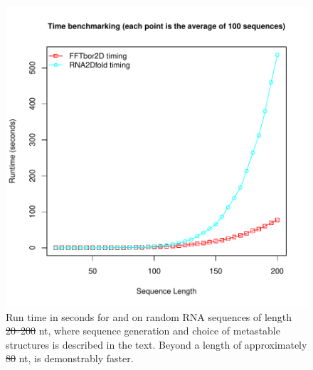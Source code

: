 \documentclass[11pt, oneside]{Thesis} %
\providecommand{\DIFadd}[1]{{\protect\color{blue}\uwave{#1}}} %
\providecommand{\DIFdel}[1]{{\protect\color{red}\sout{#1}}}                      %
\providecommand{\DIFaddFL}[1]{\DIFadd{#1}} %
\providecommand{\DIFdelFL}[1]{\DIFdel{#1}} %
\providecommand{\DIFaddbeginFL}{} %
\providecommand{\DIFaddendFL}{} %
\providecommand{\DIFdelbeginFL}{} %
\providecommand{\DIFdelendFL}{} %
\begin{document}
\begin{figure}[!ht]
\centering
\includegraphics[width=.9\textwidth]{Figures/FFTbor2D/ffttwoRtwofoldTiming.pdf}
\DIFdelbeginFL %
\DIFdelendFL \DIFaddbeginFL \caption[Run time in seconds for \rnatwofold and \ffttwo on random
RNA sequences of length $20$--$200$ nt]{\DIFaddendFL 
Run time in seconds for \rnatwofold and \ffttwo on random
RNA sequences of length \DIFdelbeginFL \DIFdelFL{20--200 }\DIFdelendFL \DIFaddbeginFL \DIFaddFL{$20$--$200$ }\DIFaddendFL nt, where sequence generation and
choice of metastable structures \strAB is described in the text.
Beyond a length of approximately \DIFdelbeginFL \DIFdelFL{80 }\DIFdelendFL \DIFaddbeginFL \DIFaddFL{$80$ }\DIFaddendFL nt, \ffttwo is demonstrably
faster.
}
\label{fig:ffttwo:ffttwoRtwofoldTiming}
\end{figure}
\end{document}
